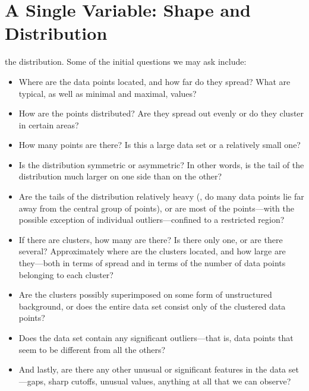 


\chapter{A Single Variable: Shape and Distribution}{}{}
\label{ch:univariate}

 
 the distribution. Some of the initial
questions we may ask include:

\begin{itemize}
\item Where are the data points located, and how far do they spread?
  What are typical, as well as minimal and maximal, values?

\item How are the points distributed? Are they spread out evenly or do
  they cluster in certain areas?

\item How many points are there? Is this a large data set or a
  relatively small one?

\item Is the distribution symmetric or asymmetric? In other words, is
  the tail of the distribution much larger on one side than on the
  other?

\item Are the tails of the distribution relatively heavy (\ie, do
  many data points lie far away from the central group of points), or
  are most of the points---with the possible exception of individual
  outliers---confined to a restricted region?

\item If there are clusters, how many are there? Is there only one, or
  are there several? Approximately where are the clusters located, and
  how large are they---both in terms of spread and in terms of the
  number of data points belonging to each cluster?

\item Are the clusters possibly superimposed on some form of
  unstructured background, or does the entire data set consist only 
  of the clustered data points?

\item Does the data set contain any significant outliers---that is,
  data points that seem to be different from all the others?

\item And lastly, are there any other unusual or significant
  features in the data set---gaps, sharp cutoffs, unusual values,
  anything at all that we can observe?
\end{itemize}

